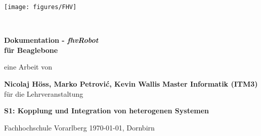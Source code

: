 \documentclass[11pt]{scrartcl}
\title{\mytitle}
\author{\myauthor}
\date{\today{}, Dornbirn}
\newcommand{\myauthor}{Nicolaj Höss, Marko Petrovi\'c, Kevin Wallis}
\newcommand{\mytitle}{Dokumentation - \textit{fhvRobot}}
\newcommand{\mysubtitle}{für Beaglebone}
\newcommand{\myuniversity}{Fachhochschule Vorarlberg}
\newcommand{\mycourse}{S1: Kopplung und Integration von heterogenen Systemen}
\newcommand{\mystudy}{Master Informatik (ITM3)}
\newcommand{\mydate}{\today{}, Dornbirn}
\begin{document}
\begin{titlepage}

\begin{minipage}{.5\textwidth} 
  \hspace{12cm}\hfill \texttt{[image: figures/FHV]} 
\end{minipage}\vspace{2cm} 

\begin{center}
~
\vfill\vfill\vfill

{\Huge\bfseries\mytitle} \\
{\Large\bfseries\mysubtitle}

\vfill

\Large{eine Arbeit von}

\vfill

{\LARGE\bfseries\myauthor}
\vfill
{\Large\bfseries\mystudy}
\vfill
\vfill
\Large{für die Lehrveranstaltung}

\vfill

{\LARGE\bfseries\mycourse}

\vfill\vfill\vfill
\vfill\vfill\vfill
\vfill\vfill\vfill

\myuniversity
\vfill
\mydate
\end{center}
\end{titlepage}



\thispagestyle{plain}
\tableofcontents

\newpage
\listoffigures
\newpage
\pagebreak









\clearpage
{}
{}

\end{document}

